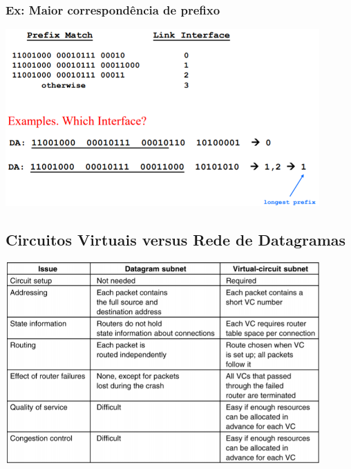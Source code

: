 \documentclass[../resumosRCOM.tex]{subfiles}
\begin{document}
\subsubsection{Ex: Maior correspondência de prefixo}
\begin{center}            
    \includegraphics[width=12cm]{images/RCOM4.png}
\end{center}

\subsection{Circuitos Virtuais versus Rede de Datagramas}
\begin{center}            
    \includegraphics[width=12cm]{images/RCOM5.png}
\end{center}
\end{document}
